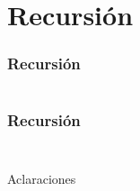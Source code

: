 \section{Recursión}
\begin{frame}[fragile]
  \frametitle{Recursión}
  {\color{white}
    \inputminted[bgcolor=bg]{haskell}{code/recursion01.hs}
  }
\end{frame}

\begin{frame}[fragile]
  \frametitle{Recursión}
  {\color{white}
    \inputminted[bgcolor=bg]{haskell}{code/recursion02.hs}
  }
  {\color{white}
    \inputminted[bgcolor=bg]{haskell}{code/recursion02.hs}
  }
\end{frame}

\begin{frame}{Aclaraciones}

\end{frame}